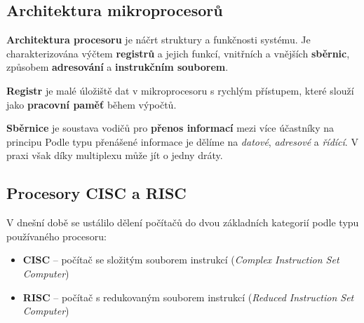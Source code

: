 \subsection{Architektura mikroprocesorů}
\textbf{Architektura procesoru} je náčrt struktury a funkčnosti systému. Je charakterizována výčtem \textbf{registrů} a jejich funkcí, vnitřních a vnějších \textbf{sběrnic}, způsobem \textbf{adresování} a \textbf{instrukčním souborem}.

\textbf{Registr} je malé úložiště dat v mikroprocesoru s rychlým přístupem, které slouží jako \textbf{pracovní paměť} během výpočtů.

\textbf{Sběrnice} je soustava vodičů pro \textbf{přenos informací} mezi více účastníky na principu  Podle typu přenášené informace je dělíme na \textit{datové}, \textit{adresové} a \textit{řídící}. V praxi však díky multiplexu může jít o jedny dráty.

\subsection{Procesory CISC a RISC}
V dnešní době se ustálilo dělení počítačů do dvou základních kategorií podle typu používaného procesoru:
\begin{itemize}
	\item{\textbf{CISC} -- počítač se složitým souborem instrukcí (\textit{Complex Instruction Set Computer})}
	\item{\textbf{RISC} -- počítač s redukovaným souborem instrukcí (\textit{Reduced Instruction Set Computer})}
\end{itemize}

